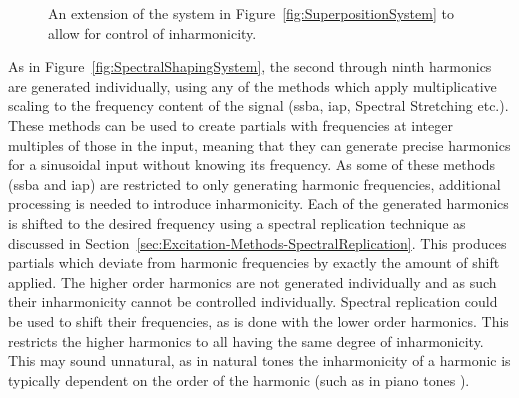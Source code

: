 \begin{figure}[h!]
			\caption{An extension of the system in Figure~\ref{fig:SuperpositionSystem} to allow for control
			         of inharmonicity.}
			\label{fig:InharmonicitySystem}
		\end{figure}

		As in Figure~\ref{fig:SpectralShapingSystem}, the second through ninth harmonics are generated
		individually, using any of the methods which apply multiplicative scaling to the frequency content of the
		signal (\acrshort{ssba}, \acrshort{iap}, Spectral Stretching etc.). These methods can be used to create
		partials with frequencies at integer multiples of those in the input, meaning that they can generate
		precise harmonics for a sinusoidal input without knowing its frequency. As some of these methods
		(\acrshort{ssba} and \acrshort{iap}) are restricted to only generating harmonic frequencies, additional
		processing is needed to introduce inharmonicity. Each of the generated harmonics is shifted to the desired
		frequency using a spectral replication technique as discussed in
		Section~\ref{sec:Excitation-Methods-SpectralReplication}.  This produces partials which deviate from
		harmonic frequencies by exactly the amount of shift applied. The higher order harmonics are not generated
		individually and as such their inharmonicity cannot be controlled individually. Spectral replication could
		be used to shift their frequencies, as is done with the lower order harmonics. This restricts the higher
		harmonics to all having the same degree of inharmonicity.  This may sound unnatural, as in natural tones
		the inharmonicity of a harmonic is typically dependent on the order of the harmonic (such as in piano tones
		\citep{young1952inharmonicity}).

